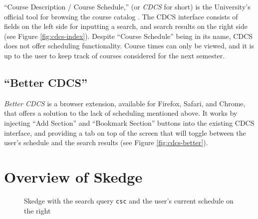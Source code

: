``Course Description / Course Schedule,'' (or \emph{CDCS} for short) is the University's official tool for browsing the course catalog \cite{cdcs}. The CDCS interface consists of fields on the left side for inputting a search, and search results on the right side (see Figure \ref{fig:cdcs-index}). Despite ``Course Schedule'' being in its name, CDCS does not offer scheduling functionality. Course times can only be viewed, and it is up to the user to keep track of courses considered for the next semester.

\subsection{``Better CDCS''}

\emph{Better CDCS} \cite{better-cdcs} is a browser extension, available for Firefox, Safari, and Chrome, that offers a solution to the lack of scheduling mentioned above. It works by injecting ``Add Section'' and ``Bookmark Section'' buttons into the existing CDCS interface, and providing a tab on top of the screen that will toggle between the user's schedule and the search results (see Figure \ref{fig:cdcs-better}).


\section{Overview of Skedge}

\begin{figure}[H]
    \centering
    \caption[Skedge with the search query {\tt csc}]{Skedge with the search query {\tt csc} and the user's current schedule on the right}
    \label{fig:sk-index}
\end{figure}

